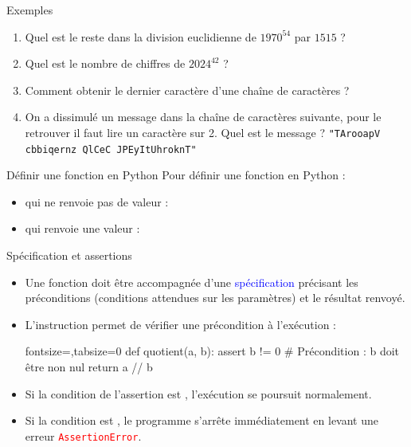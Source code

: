 \documentclass[10pt]{beamer}
\begin{document}
\begin{frame}[fragile]{\Ctitle}{\stitle}
	\begin{exampleblock}{Exemples}
		\begin{enumerate}
			\item<1-> Quel est le reste dans la division euclidienne de $1970^{54}$ par $1515$ ?
			\item<2-> Quel est le nombre de chiffres de $2024^{42}$ ?
			\item<3-> Comment obtenir le dernier caractère d'une chaîne de caractères ?
			\item<4-> On a dissimulé un message dans la chaîne de caractères suivante, pour le retrouver il faut lire un caractère sur 2. Quel est le message ?
				\texttt{"TArooapV cbbiqernz QlCeC JPEyItUhroknT"}
		\end{enumerate}
	\end{exampleblock}
\end{frame}

\begin{frame}[fragile]{\Ctitle}{\stitle}
	\begin{alertblock}{Définir une fonction en Python}
		Pour définir une fonction en Python :
		\begin{itemize}
			\item<2-> qui ne renvoie pas de valeur :
			\item<2-> qui renvoie une valeur :
		\end{itemize}
	\end{alertblock}
\end{frame}

\begin{frame}[fragile]{\Ctitle}{\stitle}
	\begin{alertblock}{Spécification et assertions}
		\begin{itemize}
			\item<1-> Une fonction doit être accompagnée d'une \textcolor{blue}{spécification} précisant les préconditions (conditions attendues sur les paramètres) et le résultat renvoyé.
			\item<2-> L'instruction \textcolor{red}{} permet de vérifier une précondition à l'exécution :
			      \begin{codepython*}{fontsize=\footnotesize,tabsize=0}
def quotient(a, b):
    assert b != 0  # Précondition : b doit être non nul
    return a // b
			      \end{codepython*}
			\item<3-> Si la condition de l'assertion est , l'exécution se poursuit normalement.
			\item<4-> Si la condition est , le programme s'arrête immédiatement en levant une erreur \textcolor{red}{\tt AssertionError}.
		\end{itemize}
	\end{alertblock}
\end{frame}
\end{document}
